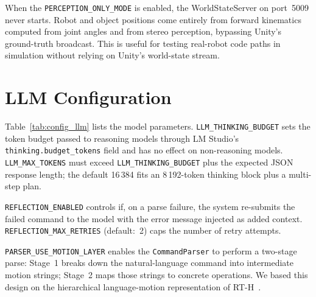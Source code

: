 \documentclass[
     12pt,
     a4paper,
     BCOR=10mm,
     DIV=14,
     listof=totoc,
     bibliography=totoc,
     parskip,
     twoside,
     headsepline
     ]{scrreprt}
\begin{document}
When the \texttt{PERCEPTION\_ONLY\_MODE} is enabled, the WorldStateServer on port~5009 never starts. Robot and object positions come entirely from forward kinematics computed from joint angles and from stereo perception, bypassing Unity's ground-truth broadcast. This is useful for testing real-robot code paths in simulation without relying on Unity's world-state stream.

\section{LLM Configuration}\label{appendix:config:llm}
Table~\ref{tab:config_llm} lists the model parameters. \texttt{LLM\_THINKING\_BUDGET} sets the token budget passed to reasoning models through LM Studio's \texttt{thinking.budget\_tokens} field and has no effect on non-reasoning models. \texttt{LLM\_MAX\_TOKENS} must exceed \texttt{LLM\_THINKING\_BUDGET} plus the expected JSON response length; the default 16\,384 fits an 8\,192-token thinking block plus a multi-step plan.

\texttt{REFLECTION\_ENABLED} controls if, on a parse failure, the system re-submits the failed command to the model with the error message injected as added context. \texttt{REFLECTION\_MAX\_RETRIES} (default:~2) caps the number of retry attempts.

\texttt{PARSER\_USE\_MOTION\_LAYER} enables the \texttt{CommandParser} to perform a two-stage parse: Stage~1 breaks down the natural-language command into intermediate motion strings; Stage~2 maps those strings to concrete operations. We based this design on the hierarchical language-motion representation of RT-H~\cite{belkhale2024rthactionhierarchiesusing}.
\end{document}
